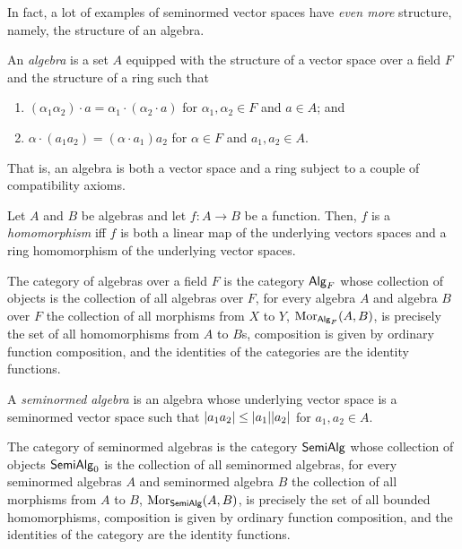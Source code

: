 In fact, a lot of examples of seminormed vector spaces have \emph{even more} structure, namely, the structure of an algebra.
\begin{dfn}[Algebra]\label{Algebra}
An \emph{algebra} is a set $A$ equipped with the structure of a vector space over a field $F$ and the structure of a ring such that
\begin{enumerate}
\item $(\alpha _1\alpha _2)\cdot a=\alpha _1\cdot (\alpha _2\cdot a)$ for $\alpha _1,\alpha _2\in F$ and $a\in A$; and
\item $\alpha \cdot (a_1a_2)=(\alpha \cdot a_1)a_2$ for $\alpha \in F$ and $a_1,a_2\in A$.
\end{enumerate}
\begin{rmk}
That is, an algebra is both a vector space and a ring subject to a couple of compatibility axioms.
\end{rmk}
\end{dfn}
\begin{dfn}\label{HomomorphismOfAlgebras}
Let $A$ and $B$ be algebras and let $f:A\rightarrow B$ be a function.  Then, $f$ is a \emph{homomorphism} iff $f$ is both a linear map of the underlying vectors spaces and a ring homomorphism of the underlying vector spaces.
\end{dfn}
\begin{exm}
The category of algebras over a field $F$ is the category $\mathsf{Alg} _F$ whose collection of objects is the collection of all algebras over $F$, for every algebra $A$ and algebra $B$ over $F$ the collection of all morphisms from $X$ to $Y$, $\operatorname{Mor} _{\mathsf{Alg} _F}(A,B)$, is precisely the set of all homomorphisms from $A$ to $B$s, composition is given by ordinary function composition, and the identities of the categories are the identity functions.
\end{exm}
\begin{dfn}\label{SeminormedAlgebra}
A \emph{seminormed algebra} is an algebra whose underlying vector space is a seminormed vector space such that $\norm[a_1a_2]\leq \norm[a_1]\norm[a_2]$ for $a_1,a_2\in A$.
\end{dfn}
\begin{exm}
The category of seminormed algebras is the category $\mathsf{Semi} \mathsf{Alg}$ whose collection of objects $\mathsf{Semi} \mathsf{Alg} _0$ is the collection of all seminormed algebras, for every seminormed algebras $A$ and seminormed algebra $B$ the collection of all morphisms from $A$ to $B$, $\operatorname{Mor} _{\mathsf{Semi} \mathsf{Alg}}(A,B)$, is precisely the set of all bounded homomorphisms, composition is given by ordinary function composition, and the identities of the category are the identity functions.
\end{exm}

